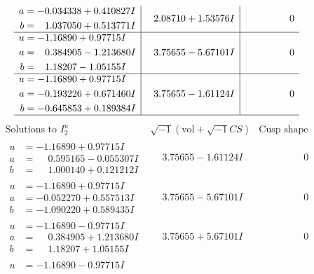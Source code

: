 \documentclass[1p]{elsarticle_modified}
\theoremstyle{definition}
\newcommand{\I}{\sqrt{-1}}
\begin{document}
$$\begin{array}{c|c|c}
\begin{aligned}
a &= -0.034338 + 0.410827 I \\
b &= \phantom{-}1.037050 + 0.513771 I\end{aligned}
 & \phantom{-}2.08710 + 1.53576 I & \phantom{-0.000000 } 0 \\ \hline\begin{aligned}
u &= -1.16890 + 0.97715 I \\
a &= \phantom{-}0.384905 - 1.213680 I \\
b &= \phantom{-}1.18207 - 1.05155 I\end{aligned}
 & \phantom{-}3.75655 - 5.67101 I & \phantom{-0.000000 } 0 \\ \hline\begin{aligned}
u &= -1.16890 + 0.97715 I \\
a &= -0.193226 + 0.671460 I \\
b &= -0.645853 + 0.189384 I\end{aligned}
 & \phantom{-}3.75655 - 1.61124 I & \phantom{-0.000000 } 0\\
 \hline 
 \end{array}$$\newpage$$\begin{array}{c|c|c}  
\text{Solutions to }I^u_{2}& \I (\text{vol} + \sqrt{-1}CS) & \text{Cusp shape}\\
 \hline 
\begin{aligned}
u &= -1.16890 + 0.97715 I \\
a &= \phantom{-}0.595165 - 0.055307 I \\
b &= \phantom{-}1.000140 + 0.121212 I\end{aligned}
 & \phantom{-}3.75655 - 1.61124 I & \phantom{-0.000000 } 0 \\ \hline\begin{aligned}
u &= -1.16890 + 0.97715 I \\
a &= -0.052270 + 0.557513 I \\
b &= -1.090220 + 0.589435 I\end{aligned}
 & \phantom{-}3.75655 - 5.67101 I & \phantom{-0.000000 } 0 \\ \hline\begin{aligned}
u &= -1.16890 - 0.97715 I \\
a &= \phantom{-}0.384905 + 1.213680 I \\
b &= \phantom{-}1.18207 + 1.05155 I\end{aligned}
 & \phantom{-}3.75655 + 5.67101 I & \phantom{-0.000000 } 0 \\ \hline\begin{aligned}
u &= -1.16890 - 0.97715 I \\

\end{aligned}
\end{array}$$
\end{document}
